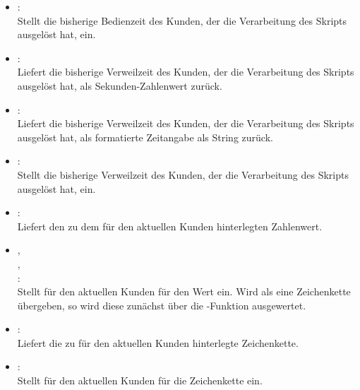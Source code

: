 \begin{itemize}
\item
{}:\\
Stellt die bisherige Bedienzeit des Kunden, der die Verarbeitung des Skripts ausgelöst hat, ein.

\item
{}:\\
Liefert die bisherige Verweilzeit des Kunden, der die Verarbeitung des Skripts ausgelöst hat, als Sekunden-Zahlenwert zurück.

\item
{}:\\
Liefert die bisherige Verweilzeit des Kunden, der die Verarbeitung des Skripts ausgelöst hat, als formatierte Zeitangabe als String zurück.

\item
{}:\\
Stellt die bisherige Verweilzeit des Kunden, der die Verarbeitung des Skripts ausgelöst hat, ein.

\item
{}:\\
Liefert den zu dem  für den aktuellen Kunden hinterlegten Zahlenwert.
  
\item
{},\\
,\\
:\\
Stellt für den aktuellen Kunden für  den Wert  ein.
Wird als  eine Zeichenkette übergeben, so wird diese zunächst über die
-Funktion ausgewertet.
  
\item
{}:\\
Liefert die zu  für den aktuellen Kunden hinterlegte Zeichenkette.
  
\item
{}:\\
Stellt für den aktuellen Kunden für  die Zeichenkette  ein.
	
\end{itemize}

